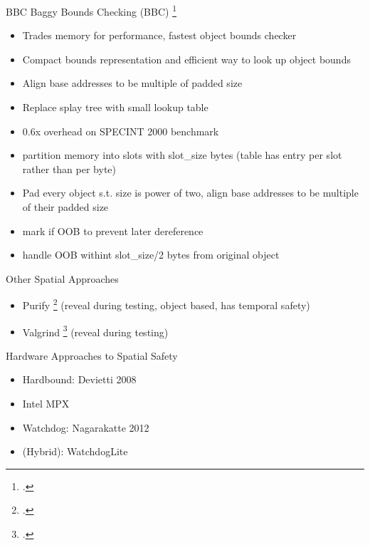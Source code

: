 \documentclass[aspectratio=169]{beamer}
\begin{document}
\begin{frame}{BBC}
\footnotesize
Baggy Bounds Checking (BBC) \footcite{akritidis_baggy_2009}
    \begin{itemize}
    \item Trades memory for performance, fastest object bounds checker
    \item Compact bounds representation and efficient way to look up object bounds
    \item Align base addresses to be multiple of padded size
    \item Replace splay tree with small lookup table
    \item 0.6x overhead on SPECINT 2000 benchmark
    \item partition memory into slots with slot\_size bytes (table has entry per slot rather than per byte)
    \item Pad every object s.t. size is power of two, align base addresses to be multiple of their padded size
    \item mark if OOB to prevent later dereference
    \item handle OOB withint slot\_size/2 bytes from original object
    \end{itemize}
\vspace{0.2in}
\end{frame}


\begin{frame}{Other Spatial Approaches}
\begin{itemize}
    \item Purify \footcite{hastings_purify:_1991} (reveal during testing, object based, has temporal safety)
    \item Valgrind \footcite{nethercote_how_2007} (reveal during testing)
\end{itemize}
\end{frame}

\begin{frame}{Hardware Approaches to Spatial Safety}
    \begin{itemize}
       \item Hardbound: Devietti 2008
       \item Intel MPX %
       \item Watchdog: Nagarakatte 2012
       \item (Hybrid): WatchdogLite
    \end{itemize}
\end{frame}
\end{document}

